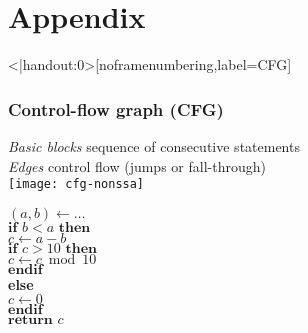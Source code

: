 \section*{Appendix}
\begin{frame}<|handout:0>[noframenumbering,label=CFG]
\frametitle{Control-flow graph (CFG)}
%
\emph{Basic blocks} sequence of consecutive statements\\
\emph{Edges} control flow (jumps or fall-through)\\
\vskip5mm
\hfill
\texttt{[image: cfg-nonssa]}\hfill
\begin{minipage}[t]{0.25\textwidth}
\footnotesize
\textperiodcentered$(a,b)\gets \ldots$\\
\textperiodcentered$\textbf{if } b<a\textbf{ then}$\\
\textperiodcentered\hspace{1em}$c\gets a-b$\\
\textperiodcentered\hspace{1em}$\textbf{if } c>10\textbf{ then}$\\
\textperiodcentered\hspace{2em}$c \gets c \bmod 10$\\
\textperiodcentered\hspace{1em}$\textbf{endif}$\\
\textperiodcentered\textbf{else}\\
\textperiodcentered\hspace{1em}$c\gets 0$\\
\textperiodcentered$\textbf{endif}$\\
\textperiodcentered$\textbf{return } c$
\bigskip
\end{minipage}\hfill\strut
\vfill\hfill\hyperlink{inf-semantics<2>}{}\vskip1cm
\end{frame}


